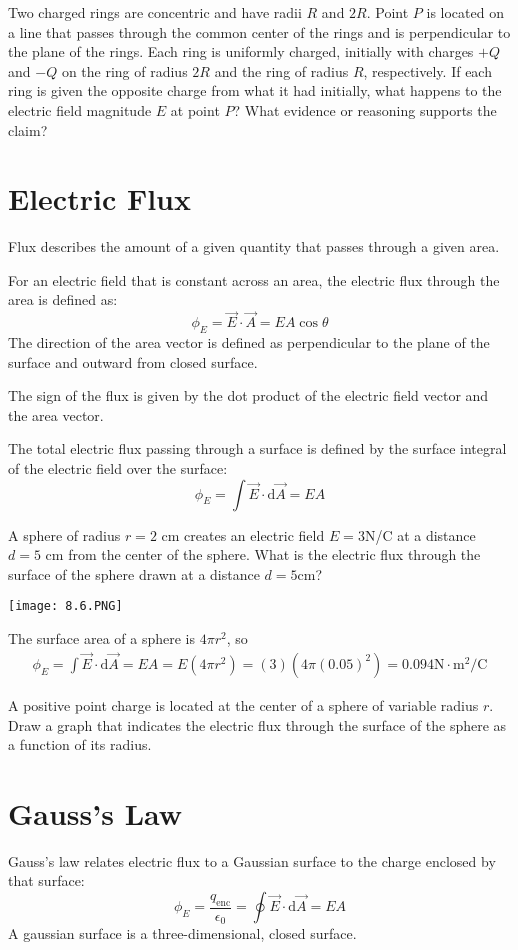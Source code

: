 \documentclass[../em.tex]{subfiles}
\begin{document}
\ex Two charged rings are concentric and have radii $R$ and $2R$. Point $P$ is located on a line that passes through the common center of the rings and is perpendicular to the plane of the rings. Each ring is uniformly charged, initially with charges $+Q$ and $-Q$ on the ring of radius $2R$ and the ring of radius $R$, respectively. If each ring is given the opposite charge from what it had initially, what happens to the electric field magnitude $E$ at point $P$? What evidence or reasoning supports the claim?

\section{Electric Flux}
Flux describes the amount of a given quantity that passes through a given area.

For an electric field that is constant across an area, the electric flux through the area is defined as:
\[\phi_E=\vec{E}\cdot\vec{A}=EA\cos\theta\]
The direction of the area vector is defined as perpendicular to the plane of the surface and outward from closed surface.

The sign of the flux is given by the dot product of the electric field vector and the area vector.

The total electric flux passing through a surface is defined by the surface integral of the electric field over the surface:
\[\phi_E=\int\vec{E}\cdot\mathrm{d}\vec{A}=EA\]
\begin{example}
    A sphere of radius $r=2$ cm creates an electric field $E=3$N/C at a distance $d=5$ cm from the 
    center of the sphere. What is the electric flux through the surface of the sphere drawn at a distance $d=5$cm?
    \begin{center}
        \texttt{[image: 8.6.PNG]}
    \end{center}
    The surface area of a sphere is $4\pi r^2$, so
    \begin{align*}
        \phi_E=\int\vec{E}\cdot\mathrm{d}\vec{A}=EA=E(4\pi r^2)=(3)(4\pi(0.05)^2)=0.094\text{N}\cdot\text{m}^2\text{/C}
    \end{align*} 
\end{example}

\ex A positive point charge is located at the center of a sphere of variable radius $r$. Draw a graph that indicates the electric flux through the surface of the sphere as a function of its radius.

\section{Gauss's Law}
Gauss's law relates electric flux to a Gaussian surface to the charge enclosed by that surface:
\[\phi_E=\frac{q_{\text{enc}}}{\epsilon_0}=\oint\vec{E}\cdot\mathrm{d}\vec{A}=EA\]
A gaussian surface is a three-dimensional, closed surface. 
\end{document}
